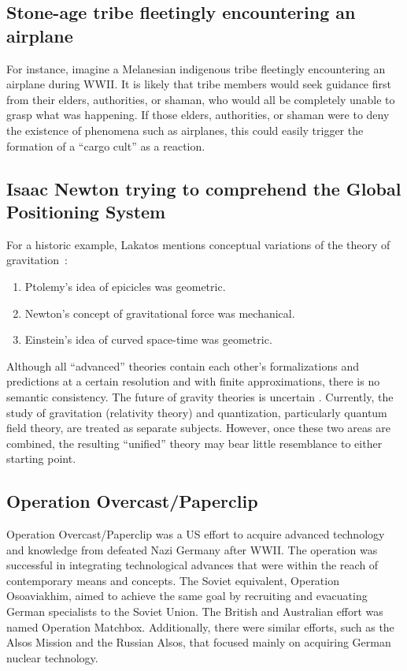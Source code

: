 \subsection{Stone-age tribe fleetingly encountering an airplane}

For instance, imagine a Melanesian indigenous tribe fleetingly encountering an airplane during WWII.
It is likely that tribe members would seek guidance first from their elders, authorities, or shaman,
who would all be completely unable to grasp what was happening.
If those elders, authorities, or shaman were to deny the existence of phenomena such as airplanes,
this could easily trigger the formation of a ``cargo cult'' as a reaction.

\subsection{Isaac Newton trying to comprehend the Global Positioning System}

For a historic example,
Lakatos mentions conceptual variations of the theory of gravitation~\cite{lakatosch}:
\begin{enumerate}
\item
Ptolemy's idea of epicicles was geometric.
\item
Newton's concept of gravitational force was mechanical.
\item
Einstein's idea of curved space-time was geometric.
\end{enumerate}

Although all ``advanced'' theories contain each other's formalizations and predictions at a certain resolution and with finite approximations, there is no semantic consistency. The future of gravity theories is uncertain \cite{isqg-cc, isqg}.
Currently, the study of gravitation (relativity theory) and quantization, particularly quantum field theory, are treated as separate subjects. However, once these two areas are combined, the resulting ``unified'' theory may bear little resemblance to either starting point.

\subsection{Operation Overcast/Paperclip}

Operation Overcast/Paperclip was a US effort to acquire advanced technology and knowledge from defeated Nazi Germany after WWII.
The operation was successful in integrating technological advances that were within the reach of contemporary means and concepts. The Soviet equivalent, Operation Osoaviakhim, aimed to achieve the same goal by recruiting and evacuating German specialists to the Soviet Union. The British and Australian effort was named Operation Matchbox. Additionally, there were similar efforts, such as the Alsos Mission and the Russian Alsos, that focused mainly on acquiring German nuclear technology.

